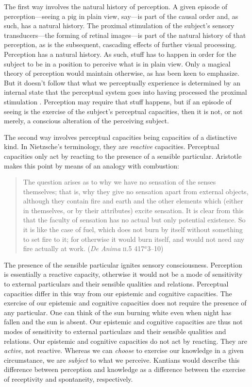 \documentclass[12pt]{article}
\begin{document}
The first way involves the natural history of perception. A given episode of perception---seeing a pig in plain view, say---is part of the causal order and, as such, has a natural history. The proximal stimulation of the subject's sensory transducers---the forming of retinal images---is part of the natural history of that perception, as is the subsequent, cascading effects of further visual processing. Perception has a natural history. As such, stuff has to happen in order for the subject to be in a position to perceive what is in plain view. Only a magical theory of perception would maintain otherwise, as \citet[]{Burge:2005uq} has been keen to emphasize. But it doesn't follow that what we perceptually experience is determined by an internal state that the perceptual system goes into having processed the proximal stimulation \citep[see][]{McDowell:2010fk}. Perception may require that stuff happens, but if an episode of seeing is the exercise of the subject's perceptual capacities, then it is not, or not merely, a conscious alteration of the perceiving subject.

The second way involves perceptual capacities being capacities of a distinctive kind. In Nietzsche's \citeyearpar{Nietzsche1887On-the-Genealog} terminology, they are \emph{reactive} capacities. Perceptual capacities only act by reacting to the presence of a sensible particular. Aristotle makes this point by means of an analogy with combustion:
\begin{quote}
	The question arises as to why we have no sensation of the senses themselves; that is, why they give no sensation apart from external objects, although they contain fire and earth and the other elements which (either in themselves, or by their attributes) excite sensation. It is clear from this that the faculty of sensation has no actual but only potential existence. So it is like the case of fuel, which does not burn by itself without something to set fire to it; for otherwise it would burn itself, and would not need any fire actually at work. (\emph{De Anima} \textsc{ii}.5 417\( ^{a} \)3--10)
\end{quote}
The presence of the sensible particular ignites sensory consciousness. Perception is essentially a reactive capacity, otherwise it would not be a mode of sensitivity to external particulars and their sensible qualities and relations. Perceptual capacities differ in this way from our epistemic and cognitive capacities. The exercise of our epistemic and cognitive capacities does not require the presence of any particular. One can think of the sun burning white even when night has fallen and the sun is absent. Our epistemic and cognitive capacities are thus not modes of sensitivity to external particulars and their sensible qualities and relations. Our epistemic and cognitive capacities do not act by reacting. They are \emph{active}, not reactive. Whereas we can \emph{choose} to exercise our knowledge in a given circumstance, we are \emph{subject} to what we perceive. Kantians would describe this difference between perception and knowledge as a difference between the exercise of receptivity and spontaneity, respectively. 
\end{document}
